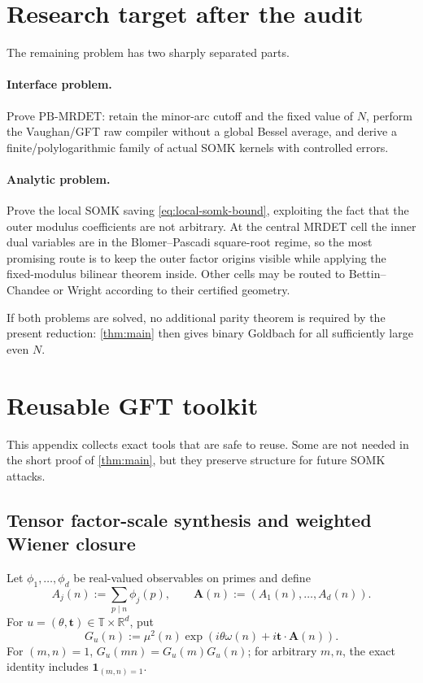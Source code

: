 \documentclass[11pt]{article}
\theoremstyle{definition}
\theoremstyle{remark}
\newcommand{\T}{\mathbb T}
\newcommand{\1}{\mathbf 1}
\newcommand{\PBM}{\mathrm{PB}\text{-}\mathrm{MRDET}}
\begin{document}
\section{Research target after the audit}\label{sec:research-target}

The remaining problem has two sharply separated parts.

\paragraph{Interface problem.}
Prove \(\PBM\): retain the minor-arc cutoff and the fixed value of \(N\), perform the Vaughan/GFT raw compiler without a global Bessel average, and derive a finite/polylogarithmic family of actual SOMK kernels with controlled errors.

\paragraph{Analytic problem.}
Prove the local SOMK saving \eqref{eq:local-somk-bound}, exploiting the fact that the outer modulus coefficients are not arbitrary.  At the central MRDET cell the inner dual variables are in the Blomer--Pascadi square-root regime, so the most promising route is to keep the outer factor origins visible while applying the fixed-modulus bilinear theorem inside.  Other cells may be routed to Bettin--Chandee or Wright according to their certified geometry.

If both problems are solved, no additional parity theorem is required by the present reduction: \cref{thm:main} then gives binary Goldbach for all sufficiently large even \(N\).

\appendix

\section{Reusable GFT toolkit}\label{app:toolkit}

This appendix collects exact tools that are safe to reuse.  Some are not needed in the short proof of \cref{thm:main}, but they preserve structure for future SOMK attacks.

\subsection{Tensor factor-scale synthesis and weighted Wiener closure}

Let \(\phi_1,\dots,\phi_d\) be real-valued observables on primes and define
\[
 A_j(n):=\sum_{p\mid n}\phi_j(p),
 \qquad
 \bm A(n):=(A_1(n),\dots,A_d(n)).
\]
For \(u=(\theta,\bm t)\in\T\times\mathbb R^d\), put
\[
 G_u(n)
 :=\mu^2(n)\exp\!\left(i\theta\omega(n)+i\bm t\cdot\bm A(n)\right).
\]
For \((m,n)=1\), \(G_u(mn)=G_u(m)G_u(n)\); for arbitrary \(m,n\), the exact identity includes \(\1_{(m,n)=1}\).
\end{document}
